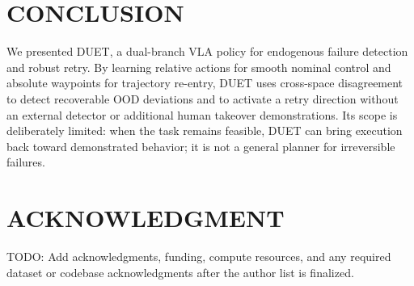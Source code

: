 \documentclass[letterpaper, 10 pt, conference]{ieeeconf}
\begin{document}
\section{CONCLUSION}

We presented DUET, a dual-branch VLA policy for endogenous failure detection and robust retry. By learning relative actions for smooth nominal control and absolute waypoints for trajectory re-entry, DUET uses cross-space disagreement to detect recoverable OOD deviations and to activate a retry direction without an external detector or additional human takeover demonstrations. Its scope is deliberately limited: when the task remains feasible, DUET can bring execution back toward demonstrated behavior; it is not a general planner for irreversible failures.

\section*{ACKNOWLEDGMENT}

TODO: Add acknowledgments, funding, compute resources, and any required dataset or codebase acknowledgments after the author list is finalized.



\end{document}
